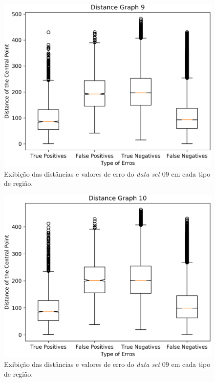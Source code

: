 \documentclass[10pt, conference]{IEEEtran}
\begin{document}
	\begin{figure}[h]
		\centering
		\includegraphics[width=1\linewidth]{img/boxplot-9.png}
		\caption{Exibição das distâncias e valores de erro do \textit{data set} 09 em cada tipo de região.}
		\label{fig:bp-9}
	\end{figure}

	\begin{figure}[h]
		\centering
		\includegraphics[width=1\linewidth]{img/boxplot-10.png}
		\caption{Exibição das distâncias e valores de erro do \textit{data set} 09 em cada tipo de região.}
		\label{fig:bp-10}
	\end{figure}
\end{document}
